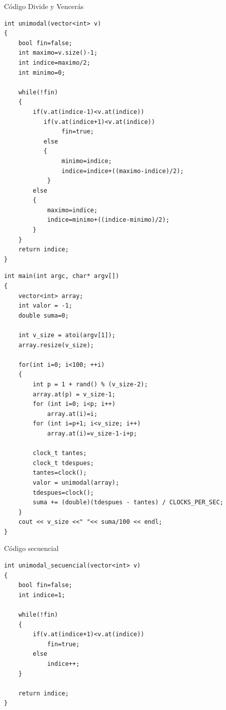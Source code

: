 \documentclass[12pt]{beamer}
\begin{document}
\begin{frame}[fragile]{Código Divide y Vencerás}
	\begin{lstlisting}
int unimodal(vector<int> v)
{
	bool fin=false;
	int maximo=v.size()-1;
	int indice=maximo/2;
	int minimo=0;
 
	while(!fin)
	{
        if(v.at(indice-1)<v.at(indice))
           if(v.at(indice+1)<v.at(indice))
			    fin=true;
		   else
		   {
				minimo=indice;
				indice=indice+((maximo-indice)/2);
			}
		else
		{
			maximo=indice;
			indice=minimo+((indice-minimo)/2);
		}
	}
	return indice;
}
	\end{lstlisting} 
\end{frame}
\begin{frame}[fragile]
	\begin{lstlisting}
int main(int argc, char* argv[])
{
	vector<int> array;
  	int valor = -1;
	double suma=0;

	int v_size = atoi(argv[1]);
	array.resize(v_size);

	for(int i=0; i<100; ++i)
	{
		int p = 1 + rand() % (v_size-2);
  		array.at(p) = v_size-1;
  		for (int i=0; i<p; i++)
  			array.at(i)=i;
  		for (int i=p+1; i<v_size; i++)
  			array.at(i)=v_size-1-i+p;

		clock_t tantes;
		clock_t tdespues;
		tantes=clock();
		valor = unimodal(array);
		tdespues=clock();
		suma += (double)(tdespues - tantes) / CLOCKS_PER_SEC;
	}
  	cout << v_size <<" "<< suma/100 << endl;
}
	\end{lstlisting}

\end{frame}

\begin{frame}[fragile]{Código secuencial}
	\begin{lstlisting}
int unimodal_secuencial(vector<int> v)
{
	bool fin=false;
  	int indice=1;

  	while(!fin)
  	{
     	if(v.at(indice+1)<v.at(indice))
      		fin=true;
     	else
      		indice++;
  	}

  	return indice;
}
	\end{lstlisting}
\end{frame}
\end{document}

